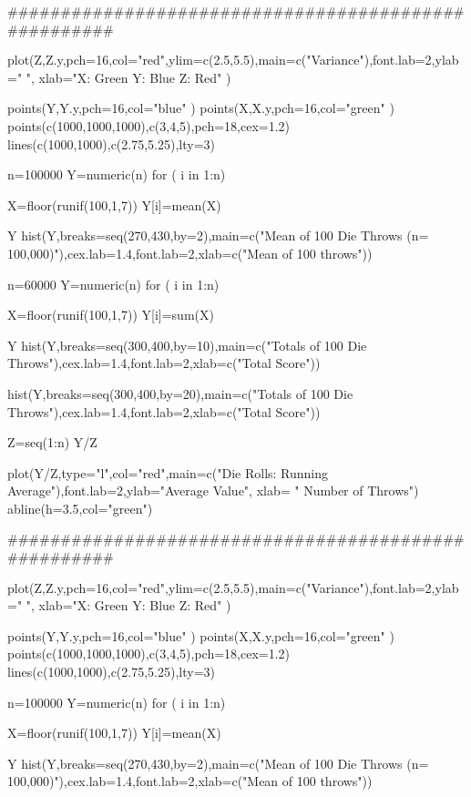 \documentclass[]{report}
\begin{document}
#####################################################

plot(Z,Z.y,pch=16,col="red",ylim=c(2.5,5.5),main=c("Variance"),font.lab=2,ylab=" ", xlab="X: Green  Y: Blue  Z: Red" )

points(Y,Y.y,pch=16,col="blue" )
points(X,X.y,pch=16,col="green" )
points(c(1000,1000,1000),c(3,4,5),pch=18,cex=1.2)
lines(c(1000,1000),c(2.75,5.25),lty=3)



n=100000
Y=numeric(n)
for ( i in 1:n){

X=floor(runif(100,1,7))
Y[i]=mean(X)
}

Y
hist(Y,breaks=seq(270,430,by=2),main=c("Mean of 100 Die Throws (n= 100,000)"),cex.lab=1.4,font.lab=2,xlab=c("Mean of 100 throws")) 

\newpage


n=60000
Y=numeric(n)
for ( i in 1:n){

X=floor(runif(100,1,7))
Y[i]=sum(X)
}

Y
hist(Y,breaks=seq(300,400,by=10),main=c("Totals of 100 Die Throws"),cex.lab=1.4,font.lab=2,xlab=c("Total Score"))

hist(Y,breaks=seq(300,400,by=20),main=c("Totals of 100 Die Throws"),cex.lab=1.4,font.lab=2,xlab=c("Total Score"))



Z=seq(1:n)
Y/Z

plot(Y/Z,type="l",col="red",main=c("Die Rolls: Running Average"),font.lab=2,ylab="Average Value", xlab=
" Number of Throws")
abline(h=3.5,col="green")


#####################################################

plot(Z,Z.y,pch=16,col="red",ylim=c(2.5,5.5),main=c("Variance"),font.lab=2,ylab=" ", xlab="X: Green  Y: Blue  Z: Red" )

points(Y,Y.y,pch=16,col="blue" )
points(X,X.y,pch=16,col="green" )
points(c(1000,1000,1000),c(3,4,5),pch=18,cex=1.2)
lines(c(1000,1000),c(2.75,5.25),lty=3)



n=100000
Y=numeric(n)
for ( i in 1:n){

X=floor(runif(100,1,7))
Y[i]=mean(X)
}

Y
hist(Y,breaks=seq(270,430,by=2),main=c("Mean of 100 Die Throws (n= 100,000)"),cex.lab=1.4,font.lab=2,xlab=c("Mean of 100 throws")) 
\end{document}
